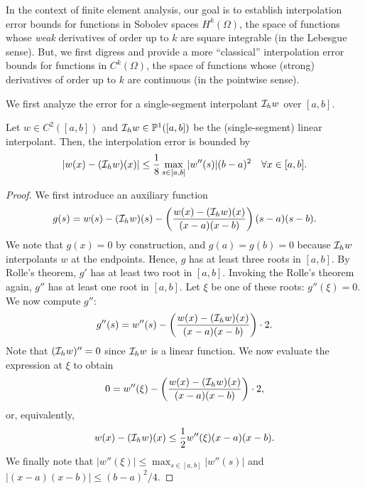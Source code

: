 In the context of finite element analysis,  our goal is to establish interpolation error bounds for functions in Sobolev spaces $H^k(\Omega)$, the space of functions whose \emph{weak} derivatives of order up to $k$ are square integrable (in the Lebesgue sense).  But, we first digress and provide a more ``classical'' interpolation error bounds for functions in $C^k(\Omega)$, the space of functions whose (strong) derivatives of order up to $k$ are continuous (in the pointwise sense).

We first analyze the error for a single-segment interpolant $\mathcal{I}_h w$ over $[a,b]$.
\begin{proposition}
  \label{prop:th_poly_Ck_ref}
  Let $w \in C^2([a,b])$ and $\mathcal{I}_h w \in \mathbb{P}^1([a,b])$ be the (single-segment) linear interpolant. Then, the interpolation error is bounded by
  \begin{equation*}
    | w(x) - (\mathcal{I}_h w)(x) | \leq \frac{1}{8} \max_{s \in [a,b]} |w''(s)| (b-a)^2 \quad \forall x \in [a,b].
  \end{equation*}
  \begin{proof}
    We first introduce an auxiliary function
    \begin{equation*}
      g(s) = w(s) - (\mathcal{I}_h w)(s) - \left( \frac{w(x) - (\mathcal{I}_h w)(x)}{(x-a)(x-b)} \right) (s-a)(s-b).
    \end{equation*}
    We note that $g(x) = 0$ by construction, and $g(a) = g(b) = 0$ because $\mathcal{I}_h w$ interpolants $w$ at the endpoints. Hence, $g$ has at least three roots in $[a,b]$. By Rolle's theorem, $g'$ has at least two root in $[a,b]$.  Invoking the Rolle's theorem again, $g''$ has at least one root in $[a,b]$. Let $\xi$ be one of these roots: $g''(\xi) = 0$. We now compute $g''$:
    \begin{equation*}
      g''(s) = w''(s) -  \left( \frac{w(x) - (\mathcal{I}_h w)(x)}{(x-a)(x-b)} \right) \cdot 2.
    \end{equation*}
    Note that $(\mathcal{I}_h w)'' = 0$ since $\mathcal{I}_h w$ is a linear function. We now evaluate the expression at $\xi$ to obtain
    \begin{equation*}
      0 = w''(\xi) - \left( \frac{w(x) - (\mathcal{I}_h w)(x)}{(x-a)(x-b)} \right) \cdot 2,
    \end{equation*}
    or, equivalently,
    \begin{equation*}
      w(x) - (\mathcal{I}_h w)(x) \leq \frac{1}{2} w''(\xi) (x-a)(x-b).
    \end{equation*}
    We finally note that $|w''(\xi)| \leq \max_{s \in [a,b]}|w''(s)|$ and $| (x-a)(x-b) | \leq (b-a)^2/4$.
  \end{proof}
\end{proposition}

